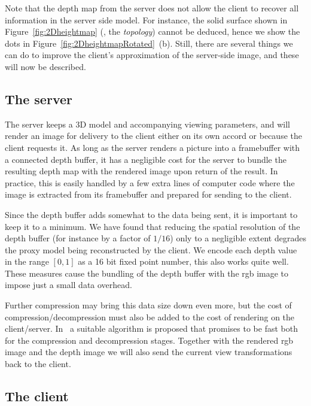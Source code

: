 Note that the depth map from the server does not allow the client to recover all
information in the server side model. For instance, the solid surface shown in
Figure~\ref{fig:2Dheightmap} (\ie, the {\em topology}) cannot be deduced, hence
we show the dots in Figure~\ref{fig:2DheightmapRotated}~(b). Still, there are
several things we can do to improve the client's approximation of
the server-side image, and these will now be described.


\subsection{The server}

The server keeps a 3D model and accompanying viewing parameters, and will render
an image for delivery to the client either on its own accord or because the
client requests it. As long as the server renders a picture into a framebuffer
with a connected depth buffer, it has a negligible cost for the server to bundle
the resulting depth map with the rendered image upon return of the result. In
practice, this is easily handled by a few extra lines of computer code where the
image is extracted from its framebuffer and prepared for sending to the
client.

Since the depth buffer adds somewhat to the data being sent, it is important to
keep it to a minimum. We have found that reducing the spatial resolution of the
depth buffer (for instance by a factor of $1/16$) only to a negligible extent
degrades the proxy model being reconstructed by the client. We encode each depth
value in the range $[0, 1]$ as a 16 bit fixed point number, this also works
quite well. These measures cause the bundling of the depth buffer with the rgb
image to impose just a small data overhead.

Further compression may bring this data size down even more, but the cost of
compression/decompression must also be added to the cost of rendering on the
client/server. In~\cite{DBLP:journals/tvcg/Lindstrom14} a suitable algorithm is
proposed that promises to be fast both for the compression and decompression
stages.  Together with the rendered rgb image and the
depth image we will also send the current view transformations back to the
client.


\subsection{The client}
\label{sec:client}

